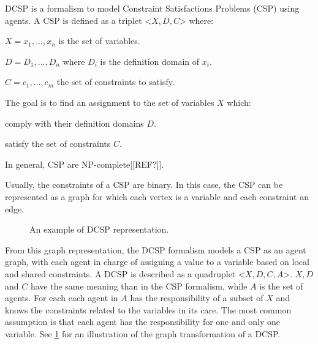 DCSP is a formalism to model Constraint Satisfactions Problems (CSP) using agents. A CSP is defined as a triplet <$X,D,C$> where:
\begin{compactitem}
\item $X = {x_1, ..., x_n}$ is the set of variables.
\item $D = {D_1, ..., D_n}$ where $D_i$ is the definition domain of $x_i$.
\item $C ={c_1, ..., c_m}$ the set of constraints to satisfy.
\end{compactitem}

The goal is to find an assignment to the set of variables $X$ which:
\begin{compactitem}
\item comply with their definition domains $D$.
\item satisfy the set of constraints $C$.
\end{compactitem}

In general, CSP are NP-complete[[REF?]].

Usually, the constraints of a CSP are binary. In this case, the CSP can be represented as a graph for which each vertex is a variable and each constraint an edge.

\begin{figure}[]
\centering
{}
\hfill
{}

\caption{An example of DCSP representation.}
\label{dcsp}

\end{figure}

From this graph representation, the DCSP formalism\cite{yokoo1998distributed} models a CSP  as an agent graph, with each agent in charge of assigning a value to a variable based on local and shared constraints. A DCSP is described as a quadruplet <$X, D, C, A$>. $X, D$ and $C$ have the same meaning than in the CSP formalism, while $A$ is the set of agents. For each each agent in $A$ has the responsibility of a subset of $X$ and knows the constraints related to the variables in its care. The most common assumption is that each agent has the responsibility for one and only one variable. See \figurename{} \ref{dcsp} for an illustration of the graph transformation of a DCSP.

